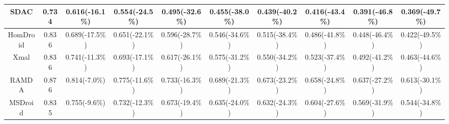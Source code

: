 \begin{table}[t]
\begin{adjustbox}{width=0.99\textwidth}
\begin{tabular}{@{}c|c|c|c|c|c|c|c|c|c@{}}
            SDAC              & 0.734               & 0.616(-16.1\%)      & 0.554(-24.5\%)      & 0.495(-32.6\%)      & 0.455(-38.0\%)       & 0.439(-40.2\%)       & 0.416(-43.4\%)       & 0.391(-46.8\%)       & 0.369(-49.7\%)       \\ \midrule
            HomDroid          & 0.836               & 0.689(-17.5\%)      & 0.651(-22.1\%)      & 0.596(-28.7\%)      & 0.546(-34.6\%)       & 0.515(-38.4\%)       & 0.486(-41.8\%)       & 0.448(-46.4\%)       & 0.422(-49.5\%)       \\ \midrule
            Xmal              & 0.836               & 0.741(-11.3\%)      & 0.693(-17.1\%)      & 0.617(-26.1\%)      & 0.575(-31.2\%)       & 0.550(-34.2\%)       & 0.523(-37.4\%)       & 0.492(-41.2\%)       & 0.463(-44.6\%)       \\ \midrule
            RAMDA             & 0.876               & 0.814(-7.0\%)       & 0.775(-11.6\%)      & 0.733(-16.3\%)      & 0.689(-21.3\%)       & 0.673(-23.2\%)       & 0.658(-24.8\%)       & 0.637(-27.2\%)       & 0.613(-30.1\%)       \\ \midrule
            MSDroid           & 0.835               & 0.755(-9.6\%)       & 0.732(-12.3\%)      & 0.673(-19.4\%)      & 0.635(-24.0\%)       & 0.632(-24.3\%)       & 0.604(-27.6\%)       & 0.569(-31.9\%)       & 0.544(-34.8\%)       \\ \bottomrule
            \end{tabular}
    \end{adjustbox}
    \label{tab:tpr_time_decay}    
\end{table}

